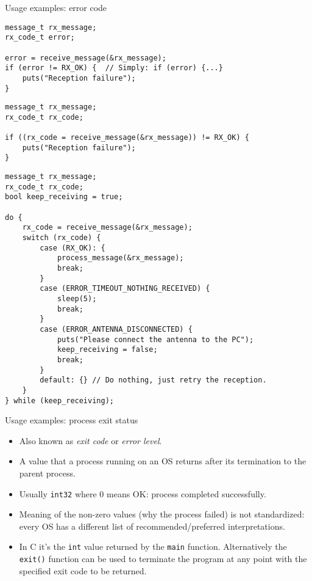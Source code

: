 \documentclass[aspectratio=169,14pt]{beamer}
\begin{document}
\begin{frame}[fragile]{Usage examples: error code}
\begin{lstlisting}[style=cstyle]
message_t rx_message;
rx_code_t error;

error = receive_message(&rx_message);
if (error != RX_OK) {  // Simply: if (error) {...}
    puts("Reception failure");
}
\end{lstlisting}

\begin{lstlisting}[style=cstyle]
message_t rx_message;
rx_code_t rx_code;

if ((rx_code = receive_message(&rx_message)) != RX_OK) {
    puts("Reception failure");
}
\end{lstlisting}
\end{frame}

\begin{frame}[fragile]{}
\begin{lstlisting}[style=cstyle,basicstyle=\scriptsize\ttfamily]
message_t rx_message;
rx_code_t rx_code;
bool keep_receiving = true;

do {
    rx_code = receive_message(&rx_message);
    switch (rx_code) {
        case (RX_OK): {
            process_message(&rx_message);
            break;
        }
        case (ERROR_TIMEOUT_NOTHING_RECEIVED) {
            sleep(5);
            break;
        }
        case (ERROR_ANTENNA_DISCONNECTED) {
            puts("Please connect the antenna to the PC");
            keep_receiving = false;
            break;
        }
        default: {} // Do nothing, just retry the reception.
    }
} while (keep_receiving);
\end{lstlisting}
\end{frame}

\begin{frame}{Usage examples: process exit status}
\begin{itemize}
    \item Also known as \textit{exit code} or \textit{error level}.
    \item A value that a process running on an OS returns after its termination to the parent process.
    \item Usually \texttt{int32} where 0 means OK: process completed successfully.
    \item Meaning of the non-zero values (why the process failed) is not standardized: every OS has a different list of recommended/preferred interpretations.
    \item In C it's the \texttt{int} value returned by the \texttt{main} function. Alternatively the \texttt{exit()} function can be used to terminate the program at any point with the specified exit code to be returned.
\end{itemize}
\end{frame}
\end{document}
